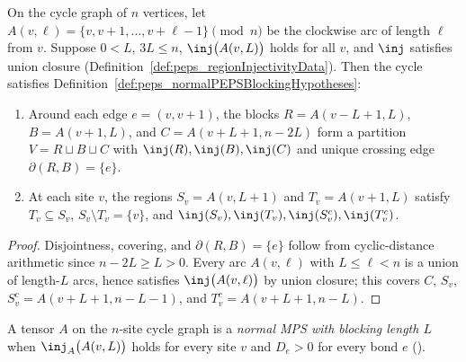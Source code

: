 \begin{lemma}%
    \label{thm:peps_cycleNormalPEPSBlockingHypotheses}
    \leanok
    On the cycle graph of $n$ vertices, let $A(v,\ell)=\{v,v+1,\ldots,v+\ell-1\}\pmod n$
    be the clockwise arc of length $\ell$ from $v$. Suppose $0<L$, $3L\le n$,
    $\inj\bigl(A(v,L)\bigr)$ holds for all $v$, and $\inj$ satisfies union
    closure (Definition~\ref{def:peps_regionInjectivityData}). Then the cycle
    satisfies Definition~\ref{def:peps_normalPEPSBlockingHypotheses}:
    \begin{enumerate}
        \item Around each edge $e=(v,v+1)$, the blocks
              $R=A(v-L+1,L)$, $B=A(v+1,L)$, and $C=A(v+L+1,n-2L)$ form a
              partition $V=R\sqcup B\sqcup C$ with $\inj(R),\inj(B),\inj(C)$
              and unique crossing edge $\partial(R,B)=\{e\}$.
        \item At each site $v$, the regions $S_v=A(v,L+1)$ and
              $T_v=A(v+1,L)$ satisfy $T_v\subseteq S_v$, $S_v\setminus T_v=\{v\}$,
              and $\inj(S_v),\inj(T_v),\inj(S_v^c),\inj(T_v^c)$.
    \end{enumerate}
\end{lemma}
\begin{proof}\leanok
    Disjointness, covering, and $\partial(R,B)=\{e\}$ follow from cyclic-distance
    arithmetic since $n-2L\ge L>0$. Every arc $A(v,\ell)$ with $L\le\ell<n$ is a
    union of length-$L$ arcs, hence satisfies $\inj\bigl(A(v,\ell)\bigr)$ by
    union closure; this covers $C$, $S_v$, $S_v^c=A(v+L+1,n-L-1)$, and
    $T_v^c=A(v+L+1,n-L)$.
\end{proof}

\begin{definition}%
    \label{def:peps_normalCycleArcMPS}
    \leanok
    A tensor $A$ on the $n$-site cycle graph is a \emph{normal MPS with
        blocking length $L$} when $\inj_A\bigl(A(v,L)\bigr)$ holds for every site
    $v$ and $D_e>0$ for every bond $e$
    \cite[Section~4]{Molnar2018NormalPEPS}
    (\cite{gap:peps_injective_ft_section3_route}).
\end{definition}

